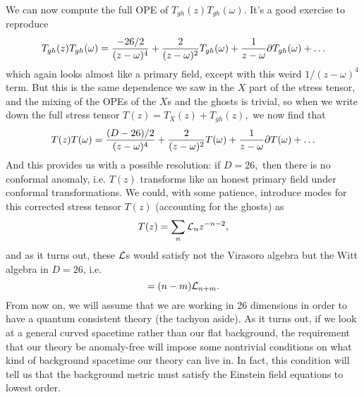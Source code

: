 We can now compute the full OPE of $T_{gh}(z) T_{gh}(\omega)$. It's a good exercise to reproduce
\begin{equation}
    T_{gh}(z)T_{gh}(\omega)=\frac{-26/2}{(z-\omega)^4} +\frac{2}{(z-\omega)^2}T_{gh}(\omega) +\frac{1}{z-\omega}\partial T_{gh}(\omega)+\ldots
\end{equation}
which again looks almost like a primary field, except with this weird $1/(z-\omega)^4$ term. But this is the same dependence we saw in the $X$ part of the stress tensor, and the mixing of the OPEs of the $X$s and the ghosts is trivial, so when we write down the full stress tensor $T(z)=T_X(z)+T_{gh}(z),$ we now find that
\begin{equation}
    T(z) T(\omega) = \frac{(D-26)/2}{(z-\omega)^4} +\frac{2}{(z-\omega)^2}T(\omega)+\frac{1}{z-\omega} \partial T(\omega)+\ldots
\end{equation}
And this provides us with a possible resolution: if $D=26,$ then there is no conformal anomaly, i.e. $T(z)$ transforms like an honest primary field under conformal transformations. We could, with some patience, introduce modes for this corrected stress tensor $T(z)$ (accounting for the ghosts) as
\begin{equation}
    T(z) = \sum_n \mathcal L_n z^{-n-2},
\end{equation}
and as it turns out, these $\mathcal L$s would satisfy not the Virasoro algebra but the Witt algebra in $D=26$, i.e.
\begin{equation}
    [\cL_n,\cL_m]=(n-m)\cL_{n+m}.
\end{equation}
From now on, we will assume that we are working in 26 dimensions in order to have a quantum consistent theory (the tachyon aside). As it turns out, if we look at a general curved spacetime rather than our flat background, the requirement that our theory be anomaly-free will impose some nontrivial conditions on what kind of background spacetime our theory can live in. In fact, this condition will tell us that the background metric must satisfy the Einstein field equations to lowest order.

